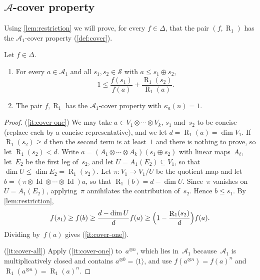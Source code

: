 \documentclass[11pt,letterpaper]{article}
\DeclareMathOperator{\tensorrank}{R}
\DeclareMathOperator{\Id}{Id}
\begin{document}
\subsection{\texorpdfstring{$\mathcal{A}$}{A}-cover property}

Using \cref{lem:restriction} we will prove, for every $f\in \Delta$, that the pair $(f, \tensorrank_1)$ has the $\mathcal{A}_1$-cover property (\cref{def:cover}).

\begin{lemma}\label{lem:tensor-cover}
Let $f \in \Delta$.
\begin{enumerate}[\upshape(i)]
\item\label{it:cover-one} For every $a \in \mathcal{A}_1$ and all $s_1, s_2 \in \mathcal{S}$ with $a \leq s_1 \oplus s_2$,
\[
1 \leq \frac{f(s_1)}{f(a)} + \frac{\tensorrank_1(s_2)}{\tensorrank_1(a)}.
\]
\item\label{it:cover-all} The pair $f, \tensorrank_1$ has the $\mathcal{A}_1$-cover property with $\kappa_a(n) = 1$.
\end{enumerate}
\end{lemma}
\begin{proof}
(\ref{it:cover-one}) We may take $a \in V_1 \otimes \cdots \otimes V_k$, $s_1$ and~$s_2$ to be concise (replace each by a concise representative), and we let $d = \tensorrank_1(a) = \dim V_1$. If $\tensorrank_1(s_2) \geq d$ then the second term is at least~$1$ and there is nothing to prove, so let $\tensorrank_1(s_2) < d$. Write $a = (A_1 \otimes \cdots \otimes A_k)(s_1 \oplus s_2)$ with linear maps~$A_\ell$, let~$E_2$ be the first leg of~$s_2$, and let $U = A_1(E_2) \subseteq V_1$, so that $\dim U \leq \dim E_2 = \tensorrank_1(s_2)$. Let $\pi : V_1 \to V_1/U$ be the quotient map and let $b = (\pi \otimes \Id \otimes \cdots \otimes \Id)a$, so that $\tensorrank_1(b) = d - \dim U$. Since~$\pi$ vanishes on $U = A_1(E_2)$, applying~$\pi$ annihilates the contribution of~$s_2$. Hence $b \leq s_1$. By \cref{lem:restriction},
\[
f(s_1) \geq f(b) \geq \frac{d - \dim U}{d} f(a) \geq \Bigl( 1 - \frac{\tensorrank_1(s_2)}{d} \Bigr) f(a).
\]
Dividing by~$f(a)$ gives (\ref{it:cover-one}).

(\ref{it:cover-all}) Apply (\ref{it:cover-one}) to~$a^{\otimes n}$, which lies in~$\mathcal{A}_1$ because~$\mathcal{A}_1$ is multiplicatively closed and contains $a^{\otimes 0} = \langle 1 \rangle$, and use $f(a^{\otimes n}) = f(a)^n$ and $\tensorrank_1(a^{\otimes n}) = \tensorrank_1(a)^n$.
\end{proof}
\end{document}
